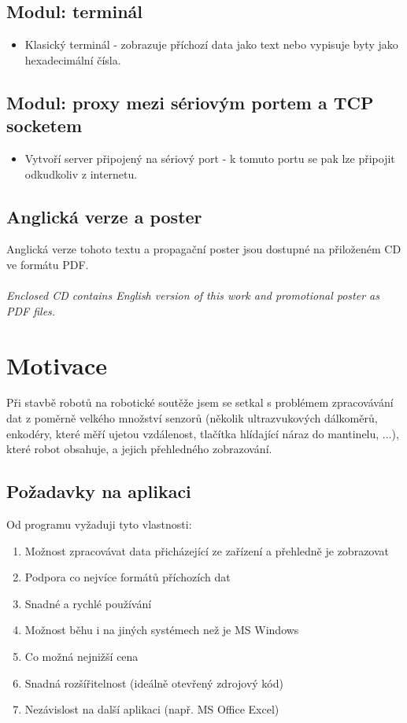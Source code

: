 \documentclass[12pt, a4paper, oneside]{article}
\newcommand{\It}{\textit}  %
\begin{document}
\subsection*{Modul: terminál}
\begin{itemize}
    \item Klasický terminál - zobrazuje příchozí data jako text nebo vypisuje byty jako hexadecimální čísla.
\end{itemize}

\subsection*{Modul: proxy mezi sériovým portem a TCP socketem}
\begin{itemize}
    \item Vytvoří server připojený na sériový port - k tomuto portu se pak lze připojit odkudkoliv z internetu.
\end{itemize}

\subsection*{Anglická verze a poster}
Anglická verze tohoto textu a propagační poster jsou dostupné na přiloženém CD ve formátu PDF.\\
\\
\noindent\It{Enclosed CD contains English version of this work and promotional poster as PDF files.}

\section{Motivace}
Při stavbě robotů na robotické soutěže jsem se setkal s problémem zpracovávání dat z poměrně velkého množství senzorů (několik ultrazvukových dálkoměrů, enkodéry, které měří ujetou vzdálenost, tlačítka hlídající náraz do mantinelu, ...), které robot obsahuje, a jejich přehledného zobrazování. 
\subsection{Požadavky na aplikaci}
Od programu vyžaduji tyto vlastnosti:
\begin{enumerate}
    \item Možnost zpracovávat data přicházející ze zařízení a přehledně je zobrazovat %
    \item Podpora co nejvíce formátů příchozích dat %
    \item Snadné a rychlé používání %
    \item Možnost běhu i na jiných systémech než je MS Windows %
    \item Co možná nejnižší cena %
    \item Snadná rozšířitelnost (ideálně otevřený zdrojový kód) %
    \item Nezávislost na další aplikaci (např. MS Office Excel) %
\end{enumerate}
\end{document}
